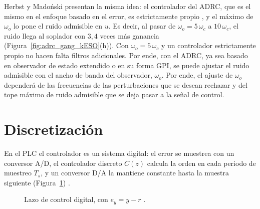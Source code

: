 Herbst y Madoński presentan la misma idea: el controlador del ADRC, que es el mismo en el enfoque
basado en el error, es estrictamente propio \cite[ecs.~4.20 y 6.30]{herbst2024adrc}, y el máximo de
$\omega_o$ lo pone el ruido admisible en $u$.  Es decir, al pasar de $\omega_o = 5\,\omega_c$ a
$10\,\omega_c$, el ruido llega al soplador con $3{,}4$ veces más ganancia
(Figura~\ref{fig:adrc_gang_kESO}(h)). Con $\omega_o = 5\,\omega_c$ y un
controlador estrictamente propio no hacen falta filtros adicionales. Por ende, con el ADRC, ya sea basado en
observador de estado extendido o en su forma GPI, se puede ajustar el ruido admisible con el ancho de banda
del observador, $\omega_o$. Por ende, el ajuste de $\omega_o$ dependerá de
las frecuencias de las perturbaciones que se desean rechazar y del tope máximo de ruido admisible
que se deja pasar a la señal de control.

\section{Discretización}
\label{sec:impl_discretizacion}

En el PLC el controlador es un sistema digital: el error se muestrea con un
conversor A/D, el controlador discreto $C(z)$ calcula la orden en cada periodo de
muestreo $T_s$, y un conversor D/A la mantiene constante hasta la muestra
siguiente (Figura~\ref{fig:lazo_digital}) \cite[sec.~12.1]{chen1993analog}.

\begin{figure}[H]
  \centering
  \caption[Lazo de control digital]{Lazo de control digital, con
    $e_y = y - r$ \cite[fig.~12.1]{chen1993analog}.}
  \label{fig:lazo_digital}
\end{figure}

